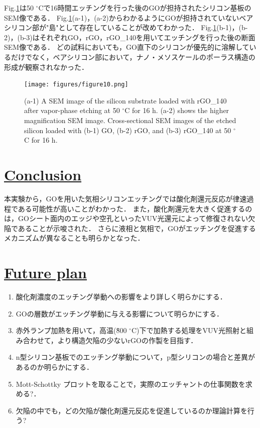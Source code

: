 \documentclass[platex,dvipdfmx]{jlreq}			%
\begin{document}

Fig.\ref{fig:SEM}は50 ${}^\circ$Cで16時間エッチングを行った後のGOが担持されたシリコン基板のSEM像である．
Fig.\ref{fig:SEM}(a-1)，(a-2)からわかるようにGOが担持されていないベアシリコン部が"島"として存在していることが改めてわかった．
Fig.\ref{fig:SEM}(b-1)，(b-2)，(b-3)はそれぞれGO，rGO，rGO\_140を用いてエッチングを行った後の断面SEM像である．
どの試料においても，GO直下のシリコンが優先的に溶解しているだけでなく，ベアシリコン部において，ナノ・メソスケールのポーラス構造の形成が観察されなかった．



\begin{figure}[H]
    \centering
    \texttt{[image: figures/figure10.png]}
    \caption{(a-1) A SEM image of the silicon substrate loaded with rGO\_140 after vapor-phase etching at 50 ${}^\circ$C for 16 h. (a-2) shows the higher magnification SEM image. Cross-sectional SEM images of the etched silicon loaded with (b-1) GO, (b-2) rGO, and (b-3) rGO\_140 at 50 ${}^\circ$C for 16 h.}
    \label{fig:SEM}
\end{figure}

\section*{\ul{Conclusion}}
本実験から，GOを用いた気相シリコンエッチングでは酸化剤還元反応が律速過程である可能性が高いことがわかった．
また，酸化剤還元を大きく促進するのは，GOシート面内のエッジや空孔といったVUV光還元によって修復されない欠陥であることが示唆された．
さらに液相と気相で，GOがエッチングを促進するメカニズムが異なることも明らかとなった．

\section*{\ul{Future plan}}
\begin{enumerate}
    \item 酸化剤濃度のエッチング挙動への影響をより詳しく明らかにする．
    \item GOの層数がエッチング挙動に与える影響について明らかにする．
    \item 赤外ランプ加熱を用いて，高温(\~ 800 ${}^\circ$C)下で加熱する処理をVUV光照射と組み合わせて，より構造欠陥の少ないrGOの作製を目指す．
    \item n型シリコン基板でのエッチング挙動について，p型シリコンの場合と差異があるのか明らかにする．
    \item Mott-Schottky プロットを取ることで，実際のエッチャントの仕事関数を求める?．
    \item 欠陥の中でも，どの欠陥が酸化剤還元反応を促進しているのか理論計算を行う?
\end{enumerate}
\end{document}
